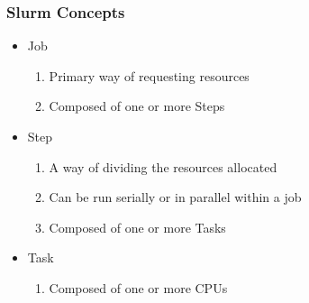 \documentclass{beamer}
\newcommand{\code}[1]{\colorbox{codegray}{\texttt{#1}}}
\begin{document}
\begin{frame}
\frametitle{Slurm Concepts}
\begin{itemize}
    \item Job
    \pause 
    \begin{enumerate}
        \item Primary way of requesting resources
        \pause
        \item Composed of one or more Steps
    \end{enumerate}
    \bigskip
    \pause
    \item Step
    \begin{enumerate}
        \item A way of dividing the resources allocated
        \pause
        \item Can be run serially or in parallel within a job
        \pause
        \item Composed of one or more Tasks
    \end{enumerate}
    \bigskip
    \pause
    \item Task
    \begin{enumerate}
        \item Composed of one or more CPUs
    \end{enumerate}
    \bigskip
\end{itemize}
\end{frame}




\end{document}
